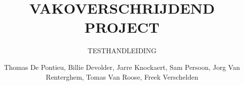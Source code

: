 \documentclass[a4paper, twoside, 12pt]{ugent_report}
\begin{document}
\title{VAKOVERSCHRIJDEND PROJECT}
\subtitle{TESTHANDLEIDING\\}
\author{Thomas De Pontieu, Billie Devolder, Jarre Knockaert, Sam Persoon, Jorg Van Renterghem, Tomas Van Roose, Freek Verschelden}
\maketitle

\restoregeometry
\newpage\null\thispagestyle{empty}\newpage
\end{document}
